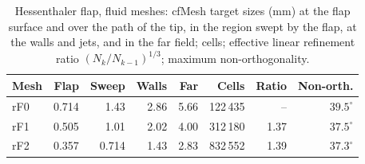 \begin{table}[htbp]
	\centering
	\small
	\caption{Hessenthaler flap, fluid meshes: cfMesh target sizes (mm) at the flap surface and over the path of the tip, in the region swept by the flap, at the walls and jets, and in the far field; cells; effective linear refinement ratio $(N_k/N_{k-1})^{1/3}$; maximum non-orthogonality.}
	\label{tab:hessenthaler_meshes}
	\begin{tabular}{lrrrrrrr}
		\toprule
		Mesh & Flap & Sweep & Walls & Far & Cells & Ratio & Non-orth. \\
		\midrule
		rF0 & 0.714 & 1.43 & 2.86 & 5.66 & 122\,435 & -- & $39.5^\circ$ \\
		rF1 & 0.505 & 1.01 & 2.02 & 4.00 & 312\,180 & 1.37 & $37.5^\circ$ \\
		rF2 & 0.357 & 0.714 & 1.43 & 2.83 & 832\,552 & 1.39 & $37.3^\circ$ \\
		\bottomrule
	\end{tabular}
\end{table}


